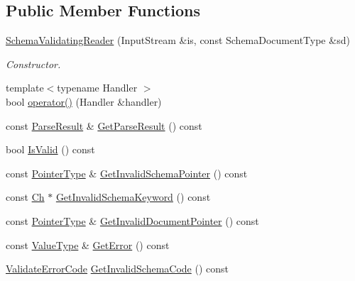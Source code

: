 \subsection*{Public Member Functions}
\begin{DoxyCompactItemize}
\item 
\hyperlink{classSchemaValidatingReader_ae7945b71687ad3dd13b9c3d096892eac}{Schema\+Validating\+Reader} (Input\+Stream \&is, const Schema\+Document\+Type \&sd)
\begin{DoxyCompactList}\small\item\em Constructor. \end{DoxyCompactList}\item 
{\footnotesize template$<$typename Handler $>$ }\\bool \hyperlink{classSchemaValidatingReader_a7135d8d53aacd850fbce2901cca4a4c3}{operator()} (Handler \&handler)
\item 
const \hyperlink{structParseResult}{Parse\+Result} \& \hyperlink{classSchemaValidatingReader_add1def2be62e1443a88c7792e5b34e3b}{Get\+Parse\+Result} () const
\item 
bool \hyperlink{classSchemaValidatingReader_a3c04fa90a430a67a993a2b8876e89ff4}{Is\+Valid} () const
\item 
const \hyperlink{classSchemaValidatingReader_a30ecf1b20ca5a1b79e0d5f4ceb3bf198}{Pointer\+Type} \& \hyperlink{classSchemaValidatingReader_a9accbbcbe9afbbe26300d943ccb46362}{Get\+Invalid\+Schema\+Pointer} () const
\item 
const \hyperlink{classSchemaValidatingReader_a6eb6f887a49dbb400800ab4fc01f02c7}{Ch} $\ast$ \hyperlink{classSchemaValidatingReader_ac3192b08923b4d68d04462b0b61ded1c}{Get\+Invalid\+Schema\+Keyword} () const
\item 
const \hyperlink{classSchemaValidatingReader_a30ecf1b20ca5a1b79e0d5f4ceb3bf198}{Pointer\+Type} \& \hyperlink{classSchemaValidatingReader_a53051bfc38cb24368fc40e4334102da8}{Get\+Invalid\+Document\+Pointer} () const
\item 
const \hyperlink{classSchemaValidatingReader_af08b51fcef602c68d95769c35ae606be}{Value\+Type} \& \hyperlink{classSchemaValidatingReader_a7a54d5f2378f85f5ca23440f8f1d214e}{Get\+Error} () const
\item 
\hyperlink{group__RAPIDJSON__ERRORS_ga2e1f88f94a5d9a6817a5de0ed2f0105a}{Validate\+Error\+Code} \hyperlink{classSchemaValidatingReader_a625f4a209960ad79485d3c8e9bc23fbb}{Get\+Invalid\+Schema\+Code} () const
\end{DoxyCompactItemize}
